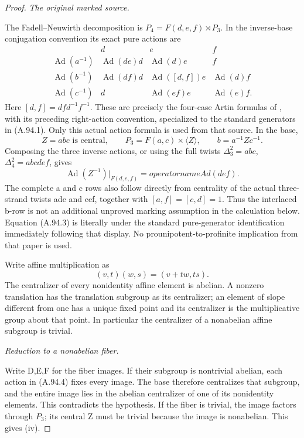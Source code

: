 \begin{proof}
\emph{The original marked source.}\par
The Fadell--Neuwirth decomposition is
\(P_4=F(d,e,f)\rtimes P_3\). In the inverse-base conjugation
convention its exact pure actions are
\[
\begin{array}{c|ccc}
 &d&e&f\\ \hline
 \operatorname{Ad}(a^{-1})&\operatorname{Ad}(de)d&\operatorname{Ad}(d)e&f\\
 \operatorname{Ad}(b^{-1})&\operatorname{Ad}(df)d&\operatorname{Ad}([d,f])e&\operatorname{Ad}(d)f\\
 \operatorname{Ad}(c^{-1})&d&\operatorname{Ad}(ef)e&\operatorname{Ad}(e)f.
\end{array}
\tag{A.94.4}
\]
Here \([d,f]=dfd^{-1}f^{-1}\). These are precisely the
four-case Artin formulas of \citet[Example~1.1,
pp.~465--466]{CECohen2010}, with its preceding right-action
convention, specialized to the standard generators in
(A.94.1). Only this actual action formula is used from that
source. In the base,
\[
 Z=abc\text{ is central},\qquad P_3=F(a,c)\times\langle Z\rangle,
 \qquad b=a^{-1}Zc^{-1}.
\]
Composing the three inverse actions, or using the full twists
\(\Delta_3^2=abc\), \(\Delta_4^2=abcdef\), gives
\[
          \operatorname{Ad}(Z^{-1})|_{F(d,e,f)}=operatorname{Ad}(def).
\tag{A.94.5}
\]
The complete a and c rows also follow directly from centrality
of the actual three-strand twists ade and cef, together with
\([a,f]=[c,d]=1\). Thus the interlaced b-row is not an
additional unproved marking assumption in the calculation below.
Equation (A.94.3) is literally
\citet[p.~547, Eq.~(4)]{Furusho2010} under the standard
pure-generator identification immediately following that
display. No prounipotent-to-profinite implication from that
paper is used.

Write affine multiplication as
\[
                 (v,t)(w,s)=(v+tw,ts).
\]
The centralizer of every nonidentity affine element is abelian.
A nonzero translation has the translation subgroup as its
centralizer; an element of slope different from one has a
unique fixed point and its centralizer is the multiplicative
group about that point. In particular the centralizer of a
nonabelian affine subgroup is trivial.

\emph{Reduction to a nonabelian fiber.}\par
Write D,E,F for the fiber images. If their subgroup is nontrivial
abelian, each action in (A.94.4) fixes every image. The base
therefore centralizes that subgroup, and the entire image lies
in the abelian centralizer of one of its nonidentity elements.
This contradicts the hypothesis. If the fiber is trivial,
the image factors through \(P_3\); its central Z must be
trivial because the image is nonabelian. This gives (iv).


\end{proof}
